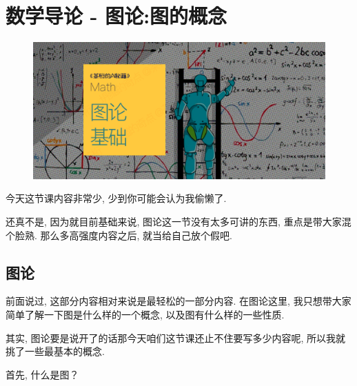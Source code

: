\chapter{数学导论 - 图论:图的概念}

\begin{figure}[ht]
  \centering
  \includegraphics[width=1\textwidth]{asset/茶桁的AI秘籍_Math_5.png}
\end{figure}

\newpage

今天这节课内容非常少, 少到你可能会认为我偷懒了. 

还真不是, 因为就目前基础来说, 图论这一节没有太多可讲的东西, 重点是带大家混个脸熟. 那么多高强度内容之后, 就当给自己放个假吧. 

\section{图论}

前面说过, 这部分内容相对来说是最轻松的一部分内容. 在图论这里, 我只想带大家简单了解一下图是什么样的一个概念, 以及图有什么样的一些性质. 

其实, 图论要是说开了的话那今天咱们这节课还止不住要写多少内容呢, 所以我就挑了一些最基本的概念. 

首先, 什么是图？

